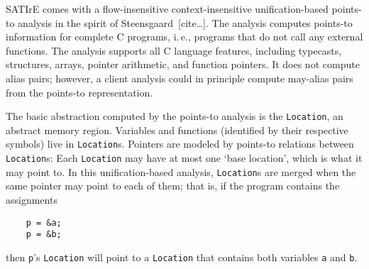 \documentclass[a4paper,12pt]{report}
\begin{document}
%
%


SATIrE comes with a flow-insensitive context-insensitive unification-based
points-to analysis in the spirit of Steensgaard~[cite\dots]. The analysis
computes points-to information for complete C programs, i.\,e., programs
that do not call any external functions. The analysis supports all C
language features, including typecasts, structures, arrays, pointer
arithmetic, and function pointers. It does not compute alias pairs; however,
a client analysis could in principle compute may-alias pairs from the
points-to representation.

The basic abstraction computed by the points-to analysis is the
\texttt{Location}, an abstract memory region. Variables and functions
(identified by their respective symbols) live in \texttt{Location}s.
Pointers are modeled by points-to relations between \texttt{Location}s: Each
\texttt{Location} may have at most one `base location', which is what it may
point to. In this unification-based analysis, \texttt{Location}s are merged
when the same pointer may point to each of them; that is, if the program
contains the assignments
\begin{verbatim}
    p = &a;
    p = &b;
\end{verbatim}
then \verb|p|'s \texttt{Location} will point to a \texttt{Location} that
contains both variables \verb|a| and \verb|b|.
\end{document}
